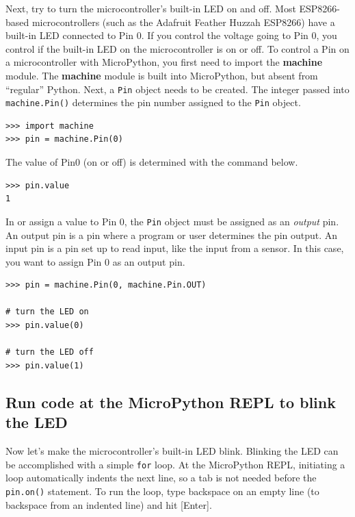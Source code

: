 \documentclass{book}
\begin{document}
Next, try to turn the microcontroller's built-in LED on and off. Most
ESP8266-based microcontrollers (such as the Adafruit Feather Huzzah
ESP8266) have a built-in LED connected to Pin 0. If you control the
voltage going to Pin 0, you control if the built-in LED on the
microcontroller is on or off. To control a Pin on a microcontroller with
MicroPython, you first need to import the \textbf{machine} module. The
\textbf{machine} module is built into MicroPython, but absent from
``regular'' Python. Next, a \lstinline!Pin! object needs to be created.
The integer passed into \lstinline!machine.Pin()! determines the pin
number assigned to the \lstinline!Pin! object.

\begin{lstlisting}
>>> import machine
>>> pin = machine.Pin(0)
\end{lstlisting}

The value of Pin0 (on or off) is determined with the command below.

\begin{lstlisting}
>>> pin.value
1
\end{lstlisting}

In or assign a value to Pin 0, the \lstinline!Pin! object must be
assigned as an \emph{output} pin. An output pin is a pin where a program
or user determines the pin output. An input pin is a pin set up to read
input, like the input from a sensor. In this case, you want to assign
Pin 0 as an output pin.

\begin{lstlisting}
>>> pin = machine.Pin(0, machine.Pin.OUT)

# turn the LED on
>>> pin.value(0)

# turn the LED off
>>> pin.value(1)
\end{lstlisting}
    




    
        \subsection{Run code at the MicroPython REPL to blink the
LED}\label{run-code-at-the-micropython-repl-to-blink-the-led}
    




    
        Now let's make the microcontroller's built-in LED blink. Blinking the
LED can be accomplished with a simple \lstinline!for! loop. At the
MicroPython REPL, initiating a loop automatically indents the next line,
so a tab is not needed before the \lstinline!pin.on()! statement. To run
the loop, type backspace on an empty line (to backspace from an indented
line) and hit {[}Enter{]}.
\end{document}
